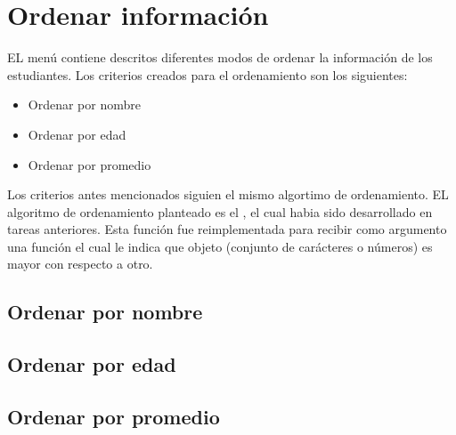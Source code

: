 \section{Ordenar información}

EL menú contiene descritos diferentes modos de ordenar la información de los estudiantes. Los criterios creados para el ordenamiento son los siguientes:

\begin{itemize}
    \item Ordenar por nombre
    \item Ordenar por edad
    \item Ordenar por promedio
\end{itemize}

Los criterios antes mencionados siguien el mismo algortimo de ordenamiento. EL algoritmo de ordenamiento planteado es el , el cual habia sido desarrollado en tareas anteriores. Esta función fue reimplementada para recibir como argumento una función el cual le indica que objeto (conjunto de carácteres o números) es mayor con respecto a otro.
\subsection{Ordenar por nombre}
\subsection{Ordenar por edad}
\subsection{Ordenar por promedio}
